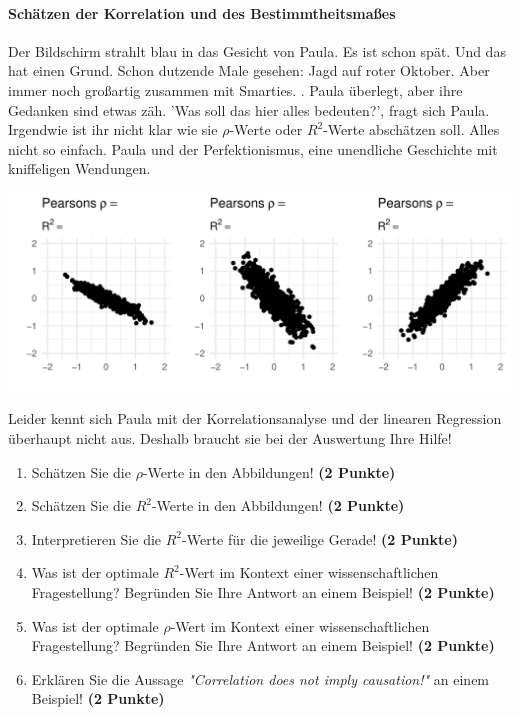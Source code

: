 \documentclass[a4paper, 9pt]{scrartcl}\usepackage[]{graphicx}\usepackage[]{xcolor}
\makeatletter
\def\maxwidth{ %
  \ifdim\Gin@nat@width>\linewidth
    \linewidth
  \else
    \Gin@nat@width
  \fi
}
\makeatother
\begin{document}
\ifcollection
\paragraph{Schätzen der Korrelation und des Bestimmtheitsmaßes}
\fi

Der Bildschirm strahlt blau in das Gesicht von Paula. Es ist schon spät. Und das hat einen Grund. Schon dutzende Male gesehen: Jagd auf roter Oktober. Aber immer noch großartig zusammen mit Smarties. . Paula überlegt, aber ihre Gedanken sind etwas zäh. 'Was soll das hier alles bedeuten?', fragt sich Paula. Irgendwie ist ihr nicht klar wie sie $\rho$-Werte oder $R^2$-Werte abschätzen soll. Alles nicht so einfach. Paula und der Perfektionismus, eine unendliche Geschichte mit kniffeligen Wendungen. 
\vspace{2Ex}



{\centering \includegraphics[width=\maxwidth]{img/correlation-02-1} 

}




Leider kennt sich Paula mit der Korrelationsanalyse und der linearen Regression überhaupt nicht aus. Deshalb braucht sie bei der Auswertung Ihre Hilfe!

\begin{enumerate}
\item Schätzen Sie die $\rho$-Werte in den Abbildungen! \textbf{(2 Punkte)}
\item Schätzen Sie die $R^2$-Werte in den Abbildungen! \textbf{(2 Punkte)}
\item Interpretieren Sie die $R^2$-Werte für die jeweilige Gerade! \textbf{(2 Punkte)}
\item Was ist der optimale $R^2$-Wert im Kontext einer wissenschaftlichen Fragestellung? Begründen Sie Ihre Antwort an einem Beispiel! \textbf{(2 Punkte)}
\item Was ist der optimale $\rho$-Wert im Kontext einer wissenschaftlichen Fragestellung? Begründen Sie Ihre Antwort an einem Beispiel! \textbf{(2 Punkte)}
\item Erklären Sie die Aussage \textit{"Correlation does not imply causation!"} an einem Beispiel! \textbf{(2 Punkte)}
\end{enumerate} 
\clearpage
\end{document}

